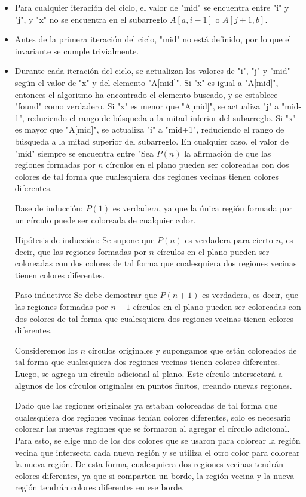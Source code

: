 \documentclass{article}
\begin{document}
\begin{itemize}
    \item Para cualquier iteración del ciclo, el valor de "mid" se encuentra entre "i" y "j", y "x" no se encuentra en el subarreglo $A[a, i-1]$ o $A[j+1, b]$.
    
    \item Antes de la primera iteración del ciclo, "mid" no está definido, por lo que el invariante se cumple trivialmente.
    
    \item Durante cada iteración del ciclo, se actualizan los valores de "i", "j" y "mid" según el valor de "x" y del elemento
    "A[mid]". Si "x" es igual a "A[mid]", entonces el algoritmo ha encontrado el elemento buscado, y se establece "found" como 
    verdadero. Si "x" es menor que "A[mid]", se actualiza "j" a "mid-1", reduciendo el rango de búsqueda a la mitad inferior del 
    subarreglo. Si "x" es mayor que "A[mid]", se actualiza "i" a "mid+1", reduciendo el rango de búsqueda a la mitad superior del 
    subarreglo. En cualquier caso, el valor de "mid" siempre se encuentra entre "Sea $P(n)$ la afirmación de que las regiones formadas por $n$ círculos en el plano pueden ser coloreadas con dos colores de tal forma que cualesquiera dos regiones vecinas tienen colores diferentes.

Base de inducción: $P(1)$ es verdadera, ya que la única región formada por un círculo puede ser coloreada de cualquier color.

Hipótesis de inducción: Se supone que $P(n)$ es verdadera para cierto $n$, es decir, que las regiones formadas por $n$ círculos en el plano pueden ser coloreadas con dos colores de tal forma que cualesquiera dos regiones vecinas tienen colores diferentes.

Paso inductivo: Se debe demostrar que $P(n+1)$ es verdadera, es decir, que las regiones formadas por $n+1$ círculos en el plano pueden ser coloreadas con dos colores de tal forma que cualesquiera dos regiones vecinas tienen colores diferentes.

Consideremos los $n$ círculos originales y supongamos que están coloreados de tal forma que cualesquiera dos regiones vecinas tienen colores diferentes. Luego, se agrega un círculo adicional al plano. Este círculo intersectará a algunos de los círculos originales en puntos finitos, creando nuevas regiones.

Dado que las regiones originales ya estaban coloreadas de tal forma que cualesquiera dos regiones vecinas tenían colores diferentes, solo es necesario colorear las nuevas regiones que se formaron al agregar el círculo adicional. Para esto, se elige uno de los dos colores que se usaron para colorear la región vecina que intersecta cada nueva región y se utiliza el otro color para colorear la nueva región. De esta forma, cualesquiera dos regiones vecinas tendrán colores diferentes, ya que si comparten un borde, la región vecina y la nueva región tendrán colores diferentes en ese borde.


\end{itemize}
\end{document}
